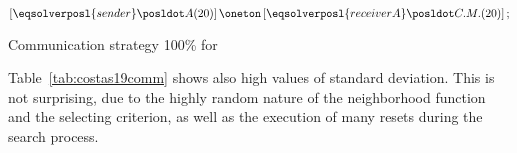 \begin{algorithm}
\dontprintsemicolon
\SetNoline
$\left[\eqsolverposl{sender}\posldot A(20)\right] \oneton \left[\eqsolverposl{receiverA}\posldot C.M.(20)\right];$
\caption{Communication strategy \oneTn{} 100\% for \CARRP}\label{comm:costas1001N}
\end{algorithm}

Table~\ref{tab:costas19comm} shows also high values of standard deviation. This is not surprising, due to the highly random nature of the neighborhood function and the selecting criterion, as well as the execution of many resets during the search process.




%
%

